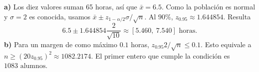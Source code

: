 \textbf{a)} Los diez valores suman 65 horas, así que $\bar x=6.5$.
Como la población es normal y $\sigma=2$ es conocida, usamos
$\bar x\pm z_{1-\alpha/2}\sigma/\sqrt n$. Al $90\%$,
$z_{0.95}\approx1.644854$. Resulta
\[
6.5\pm 1.644854\frac{2}{\sqrt{10}}
\approx\boxed{[5.460,\ 7.540]\text{ horas}}.
\]
\textbf{b)} Para un margen de como máximo $0.1$ horas,
$z_{0.95}2/\sqrt n\le0.1$. Esto equivale a
$n\ge(20z_{0.95})^2\approx1082.2174$. El primer entero
que cumple la condición es $\boxed{1083\text{ alumnos}}$.
